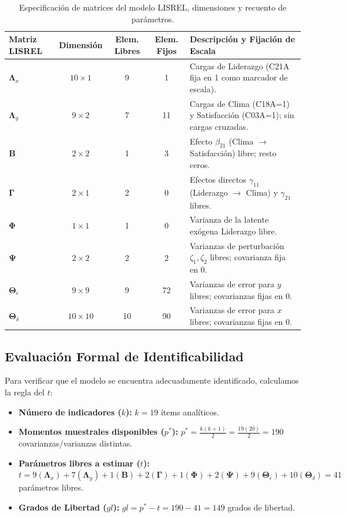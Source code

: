 \documentclass[11pt, a4paper]{article} %
\begin{document}
\begin{table}[H]
\centering
\caption{Especificación de matrices del modelo LISREL, dimensiones y recuento de parámetros.}
\label{tab:matrices_lisrel}
\footnotesize
\begin{tabularx}{\textwidth}{l c c c X}
\toprule
\textbf{Matriz LISREL} & \textbf{Dimensión} & \textbf{Elem. Libres} & \textbf{Elem. Fijos} & \textbf{Descripción y Fijación de Escala} \\
\midrule
$\mathbf{\Lambda}_x$ & $10 \times 1$ & 9 & 1 & Cargas de Liderazgo (C21A fija en 1 como marcador de escala). \\
$\mathbf{\Lambda}_y$ & $9 \times 2$ & 7 & 11 & Cargas de Clima (C18A=1) y Satisfacción (C03A=1); sin cargas cruzadas. \\
$\mathbf{B}$ & $2 \times 2$ & 1 & 3 & Efecto $\beta_{21}$ (Clima $\rightarrow$ Satisfacción) libre; resto ceros. \\
$\mathbf{\Gamma}$ & $2 \times 1$ & 2 & 0 & Efectos directos $\gamma_{11}$ (Liderazgo $\rightarrow$ Clima) y $\gamma_{21}$ libres. \\
$\mathbf{\Phi}$ & $1 \times 1$ & 1 & 0 & Varianza de la latente exógena Liderazgo libre. \\
$\mathbf{\Psi}$ & $2 \times 2$ & 2 & 2 & Varianzas de perturbación $\zeta_1, \zeta_2$ libres; covarianza fija en 0. \\
$\mathbf{\Theta}_\epsilon$ & $9 \times 9$ & 9 & 72 & Varianzas de error para $y$ libres; covarianzas fijas en 0. \\
$\mathbf{\Theta}_\delta$ & $10 \times 10$ & 10 & 90 & Varianzas de error para $x$ libres; covarianzas fijas en 0. \\
\bottomrule
\end{tabularx}
\end{table}

\subsection{Evaluación Formal de Identificabilidad}

Para verificar que el modelo se encuentra adecuadamente identificado, calculamos la regla del $t$:

\begin{itemize}[leftmargin=*, itemsep=2pt]
    \item \textbf{Número de indicadores ($k$):} $k = 19$ ítems analíticos.
    \item \textbf{Momentos muestrales disponibles ($p^*$):} $p^* = \frac{k(k+1)}{2} = \frac{19(20)}{2} = 190$ covarianzas/varianzas distintas.
    \item \textbf{Parámetros libres a estimar ($t$):} $t = 9 (\mathbf{\Lambda}_x) + 7 (\mathbf{\Lambda}_y) + 1 (\mathbf{B}) + 2 (\mathbf{\Gamma}) + 1 (\mathbf{\Phi}) + 2 (\mathbf{\Psi}) + 9 (\mathbf{\Theta}_\epsilon) + 10 (\mathbf{\Theta}_\delta) = 41$ parámetros libres.
    \item \textbf{Grados de Libertad ($gl$):} $gl = p^* - t = 190 - 41 = 149$ grados de libertad.
\end{itemize}
\end{document}
